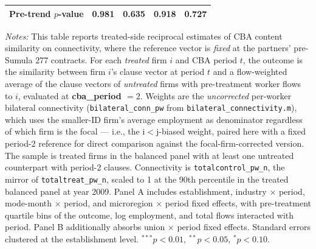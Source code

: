 \begin{table}[H]
\begin{tabular}{lcccc}
Pre-trend $p$-value & 0.981 & 0.635 & 0.918 & 0.727 \\
\bottomrule
\end{tabular}
\begin{minipage}{\linewidth}
\footnotesize\vspace{4pt}
\textit{Notes:} This table reports treated-side reciprocal estimates of CBA content similarity on connectivity, where the reference vector is \emph{fixed} at the partners' pre-Sumula 277 contracts. For each \emph{treated} firm $i$ and CBA period $t$, the outcome is the similarity between firm $i$'s clause vector at period $t$ and a flow-weighted average of the clause vectors of \emph{untreated} firms with pre-treatment worker flows to $i$, evaluated at \textbf{cba\_period $= 2$}. Weights are the \emph{uncorrected} per-worker bilateral connectivity (\texttt{bilateral\_conn\_pw} from \texttt{bilateral\_connectivity.m}), which uses the smaller-ID firm's average employment as denominator regardless of which firm is the focal --- i.e., the i$<$j-biased weight, paired here with a fixed period-2 reference for direct comparison against the focal-firm-corrected version. The sample is treated firms in the balanced panel with at least one untreated counterpart with period-2 clauses. Connectivity is \texttt{totalcontrol\_pw\_n}, the mirror of \texttt{totaltreat\_pw\_n}, scaled to 1 at the 90th percentile in the treated balanced panel at year 2009. Panel A includes establishment, industry $\times$ period, mode-month $\times$ period, and microregion $\times$ period fixed effects, with pre-treatment quartile bins of the outcome, log employment, and total flows interacted with period. Panel B additionally absorbs union $\times$ period fixed effects. Standard errors clustered at the establishment level. $^{***}p<0.01$, $^{**}p<0.05$, $^{*}p<0.10$.
\end{minipage}
\end{table}
